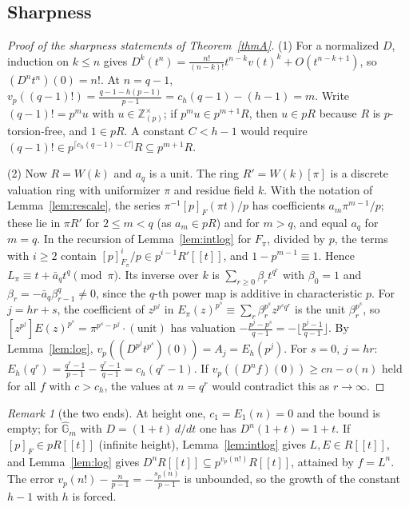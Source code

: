 \documentclass[11pt]{amsart}
\theoremstyle{definition}
\theoremstyle{remark}
\newtheorem{remark}[thm]{Remark}
\newcommand{\Z}{\mathbb Z}
\newcommand{\vp}{v_p}
\begin{document}
\subsection{Sharpness}

\begin{proof}[Proof of the sharpness statements of Theorem~\ref{thmA}]
(1) For a normalized $D$, induction on $k\le n$ gives $D^k(t^n)=\frac{n!}{(n-k)!}t^{n-k}v(t)^k+O(t^{n-k+1})$, so $(D^nt^n)(0)=n!$. At $n=q-1$, $\vp((q-1)!)=\frac{q-1-h(p-1)}{p-1}=c_h(q-1)-(h-1)=m$. Write $(q-1)!=p^mu$ with $u\in\Z_{(p)}^\times$; if $p^mu\in p^{m+1}R$, then $u\in pR$ because $R$ is $p$-torsion-free, and $1\in pR$. A constant $C<h-1$ would require $(q-1)!\in p^{\lceil c_h(q-1)-C\rceil}R\subseteq p^{m+1}R$.

(2) Now $R=W(k)$ and $a_q$ is a unit. The ring $R'=W(k)[\pi]$ is a discrete valuation ring with uniformizer $\pi$ and residue field $k$. With the notation of Lemma~\ref{lem:rescale}, the series $\pi^{-1}[p]_F(\pi t)/p$ has coefficients $a_m\pi^{m-1}/p$; these lie in $\pi R'$ for $2\le m<q$ (as $a_m\in pR$) and for $m>q$, and equal $a_q$ for $m=q$. In the recursion of Lemma~\ref{lem:intlog} for $F_\pi$, divided by $p$, the terms with $i\ge2$ contain $[p]_{F_\pi}^i/p\in p^{i-1}R'[[t]]$, and $1-p^{m-1}\equiv1$. Hence $L_\pi\equiv t+\bar a_qt^q\pmod{\pi}$. Its inverse over $k$ is $\sum_{r\ge0}\beta_rt^{q^r}$ with $\beta_0=1$ and $\beta_r=-\bar a_q\beta_{r-1}^q\ne0$, since the $q$-th power map is additive in characteristic $p$. For $j=hr+s$, the coefficient of $z^{p^j}$ in $E_\pi(z)^{p^s}\equiv\sum_r\beta_r^{p^s}z^{p^sq^r}$ is the unit $\beta_r^{p^s}$, so $[z^{p^j}]E(z)^{p^s}=\pi^{p^s-p^j}\cdot(\text{unit})$ has valuation $-\frac{p^j-p^s}{q-1}=-\lfloor\frac{p^j-1}{q-1}\rfloor$. By Lemma~\ref{lem:log}, $\vp((D^{p^j}t^{p^s})(0))=A_j=E_h(p^j)$. For $s=0$, $j=hr$: $E_h(q^r)=\frac{q^r-1}{p-1}-\frac{q^r-1}{q-1}=c_h(q^r-1)$. If $\vp((D^nf)(0))\ge cn-o(n)$ held for all $f$ with $c>c_h$, the values at $n=q^r$ would contradict this as $r\to\infty$.
\end{proof}

\begin{remark}[the two ends]
At height one, $c_1=E_1(n)=0$ and the bound is empty; for $\widehat{\mathbb G}_m$ with $D=(1+t)\,d/dt$ one has $D^n(1+t)=1+t$. If $[p]_F\in pR[[t]]$ (infinite height), Lemma~\ref{lem:intlog} gives $L,E\in R[[t]]$, and Lemma~\ref{lem:log} gives $D^nR[[t]]\subseteq p^{\vp(n!)}R[[t]]$, attained by $f=L^n$. The error $\vp(n!)-\frac n{p-1}=-\frac{s_p(n)}{p-1}$ is unbounded, so the growth of the constant $h-1$ with $h$ is forced.
\end{remark}
\end{document}
